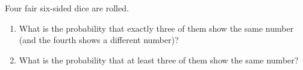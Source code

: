 Four fair six-sided dice are rolled.
\begin{enumerate}
\item[(a)] What is the probability that exactly three of them show the same number (and the fourth shows a different number)?
\item[(b)] What is the probability that at least three of them show the same number?
\end{enumerate}

